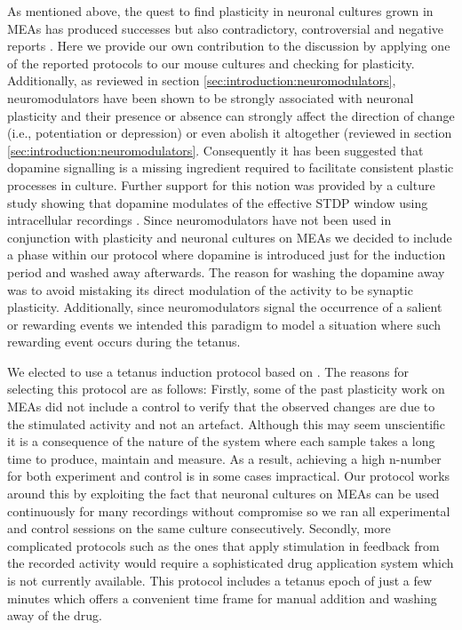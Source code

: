     As mentioned above, the quest to find plasticity in neuronal cultures grown in MEAs has produced successes but also contradictory, controversial and negative reports \cite{wagenaar2006searching,le2009slow}. Here we provide our own contribution to the discussion by applying one of the reported protocols
    to our mouse cultures and checking for plasticity. Additionally, as reviewed in section \ref{sec:introduction:neuromodulators}, neuromodulators have been shown to be strongly associated with neuronal plasticity and their presence or absence can strongly affect the direction of change (i.e., potentiation or depression) or even abolish it altogether (reviewed in section \ref{sec:introduction:neuromodulators}. Consequently it has been suggested that dopamine signalling is a missing ingredient required to facilitate consistent plastic processes in culture. Further support for this notion was provided by a culture study showing that dopamine modulates of the effective STDP window using intracellular recordings \cite{zhang2009gain}. Since neuromodulators have not been used in conjunction with plasticity and neuronal cultures on MEAs we decided to include a phase within our protocol where dopamine is introduced just for the induction period and washed away afterwards. The reason for washing the dopamine away was to avoid mistaking its direct modulation of the activity to be synaptic plasticity. Additionally, since neuromodulators signal the occurrence of a salient or rewarding events we intended this paradigm to model a situation where such rewarding event occurs during the tetanus.

    We elected to use a tetanus induction protocol based on \cite{chiappalone2008network}. The reasons for selecting this protocol are as follows: Firstly, some of the past plasticity work on MEAs did not include a control to verify that the observed changes are due to the stimulated activity and not an artefact. Although this may seem unscientific it is a consequence of the nature of the system where each sample takes a long time to produce, maintain and measure. As a result, achieving a high n-number for both experiment and control is in some cases impractical. Our protocol works around this by exploiting the fact that neuronal cultures on MEAs can be used continuously for many recordings without compromise so we ran all experimental and control sessions on the same culture consecutively. Secondly, more complicated protocols such as the ones that apply stimulation in feedback from the recorded activity would require a sophisticated drug application system which is not currently available. This protocol includes a tetanus epoch of just a few minutes which offers a convenient time frame for manual addition and washing away of the drug.

